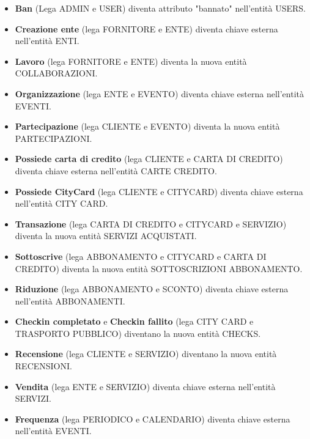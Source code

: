 \begin{itemize}
    \item 
    \textbf{Ban} (Lega ADMIN e USER) \textrightarrow \thinspace 
    diventa attributo "bannato" nell'entità USERS.

    \item 
    \textbf{Creazione ente} (lega FORNITORE e ENTE) \textrightarrow \thinspace 
    diventa chiave esterna nell'entità ENTI.

    \item 
    \textbf{Lavoro} (lega FORNITORE e ENTE) \textrightarrow \thinspace 
    diventa la nuova entità COLLABORAZIONI.

    \item 
    \textbf{Organizzazione} (lega ENTE e EVENTO) \textrightarrow \thinspace 
    diventa chiave esterna nell'entità EVENTI.

    \item 
    \textbf{Partecipazione} (lega CLIENTE e EVENTO) \textrightarrow \thinspace
    diventa la nuova entità PARTECIPAZIONI.

    \item 
    \textbf{Possiede carta di credito} (lega  CLIENTE e CARTA DI CREDITO) \textrightarrow \thinspace 
    diventa chiave esterna nell'entità CARTE CREDITO.

    \item 
    \textbf{Possiede CityCard} (lega CLIENTE e CITYCARD) \textrightarrow \thinspace 
    diventa chiave esterna nell'entità CITY CARD.

    \item 
    \textbf{Transazione} (lega CARTA DI CREDITO e CITYCARD e SERVIZIO) \textrightarrow \thinspace 
    diventa la nuova entità SERVIZI ACQUISTATI.

    \item 
    \textbf{Sottoscrive} (lega ABBONAMENTO e CITYCARD e CARTA DI CREDITO)  \textrightarrow \thinspace 
    diventa la nuova entità SOTTOSCRIZIONI ABBONAMENTO.

    \item 
    \textbf{Riduzione} (lega ABBONAMENTO e SCONTO) \textrightarrow \thinspace 
    diventa chiave esterna nell'entità ABBONAMENTI.
    
    \item 
    \textbf{Checkin completato} e \textbf{Checkin fallito} (lega CITY CARD e TRASPORTO PUBBLICO)  \textrightarrow \thinspace 
    diventano la nuova entità CHECKS.
    
    \item 
    \textbf{Recensione} (lega CLIENTE e SERVIZIO)  \textrightarrow \thinspace 
    diventano la nuova entità RECENSIONI.
    
    \item 
    \textbf{Vendita} (lega ENTE e SERVIZIO)  \textrightarrow \thinspace 
    diventa chiave esterna nell'entità SERVIZI.
    
    \item 
    \textbf{Frequenza} (lega PERIODICO e CALENDARIO)  \textrightarrow \thinspace 
    diventa chiave esterna nell'entità EVENTI.

    
\end{itemize}
